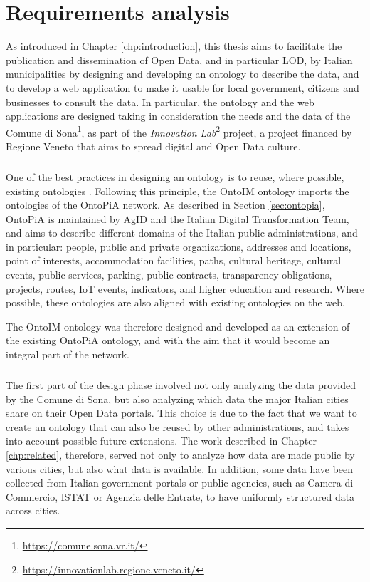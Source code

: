 \chapter{Requirements analysis}
\label{chp:requirements}

As introduced in Chapter \ref{chp:introduction}, this thesis aims to facilitate the publication and dissemination of Open Data, and in particular \acl{LOD}, by Italian municipalities by designing and developing an ontology to describe the data, and to develop a web application to make it usable for local government, citizens and businesses to consult the data. In particular, the ontology and the web applications are designed taking in consideration the needs and the data of the Comune di Sona\footnote{\url{https://comune.sona.vr.it/}}, as part of the \textit{Innovation Lab}\footnote{\url{https://innovationlab.regione.veneto.it/}} project, a project financed by Regione Veneto that aims to spread digital and Open Data culture.

\paragraph*{}
One of the best practices in designing an ontology is to reuse, where possible, existing ontologies \cite{noy2001ontology}. Following this principle, the \ac{OntoIM} ontology imports the ontologies of the OntoPiA network. As described in Section \ref{sec:ontopia}, OntoPiA is maintained by \ac{AgID} and the Italian Digital Transformation Team, and aims to describe different domains of the Italian public administrations, and in particular: people, public and private organizations, addresses and locations, point of interests, accommodation facilities, paths, cultural heritage, cultural events, public services, parking, public contracts, transparency obligations, projects, routes, IoT events, indicators, and higher education and research. Where possible, these ontologies are also aligned with existing ontologies on the web.

The \ac{OntoIM} ontology was therefore designed and developed as an extension of the existing OntoPiA ontology, and with the aim that it would become an integral part of the network.

\paragraph*{}
The first part of the design phase involved not only analyzing the data provided by the Comune di Sona, but also analyzing which data the major Italian cities share on their Open Data portals. This choice is due to the fact that we want to create an ontology that can also be reused by other administrations, and takes into account possible future extensions. The work described in Chapter \ref{chp:related}, therefore, served not only to analyze how data are made public by various cities, but also what data is available. In addition, some data have been collected from Italian government portals or public agencies, such as Camera di Commercio, ISTAT or Agenzia delle Entrate, to have uniformly structured data across cities.

